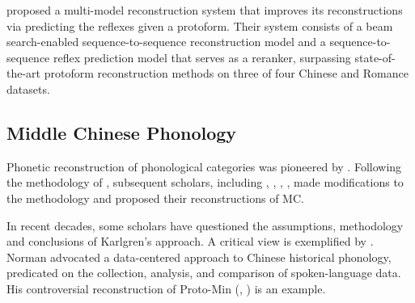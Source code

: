 \citet{lu-2024-improved-neural} proposed a multi-model reconstruction system that improves its reconstructions via predicting the reflexes given a protoform. Their system consists of a beam search-enabled sequence-to-sequence reconstruction model and a sequence-to-sequence reflex prediction model that serves as a reranker, surpassing state-of-the-art protoform reconstruction methods on three of four Chinese and Romance datasets.

\subsection{Middle Chinese Phonology} \label{related-work-MCP}

Phonetic reconstruction of phonological categories was pioneered by \citet{gbh}. 
Following the methodology of \citet{gbh}, subsequent scholars, including \citet{lfk-1971}, \citet{wangli-1957}, \citet{pulleyblanks}, \citet{Baxter1992}, made modifications to the methodology and proposed their reconstructions of MC.

In recent decades, some scholars have questioned the assumptions, methodology and conclusions of Karlgren's approach.
A critical view is exemplified by \citet{norman-1995}. 
Norman advocated a data-centered approach to Chinese historical phonology, predicated on the collection, analysis, and comparison of spoken-language data. 
His controversial reconstruction of Proto-Min (\citealp{Norman-1973}, \citeyear{norman-1974}) is an example.

